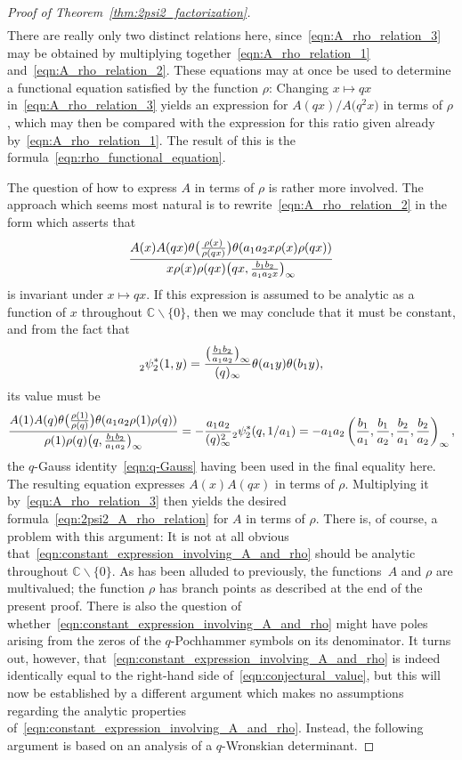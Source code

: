 \documentclass[10pt,a4paper]{amsart}
\numberwithin{equation}{section}
\newcommand{\C}{\mathbb{C}}
\begin{document}
\begin{proof}[Proof of Theorem~\ref{thm:2psi2_factorization}]
\begin{gather}
\end{gather}
There are really only two distinct relations here, since~\eqref{eqn:A_rho_relation_3} may be obtained by multiplying together~\eqref{eqn:A_rho_relation_1} and~\eqref{eqn:A_rho_relation_2}. These equations may at once be used to determine a functional equation satisfied by the function $\rho$: Changing $x \mapsto qx$ in~\eqref{eqn:A_rho_relation_3} yields an expression for $A(qx)/A\bigl(q^2x\bigr)$ in terms of $\rho$, which may then be compared with the expression for this ratio given already by~\eqref{eqn:A_rho_relation_1}. The result of this is the formula~\eqref{eqn:rho_functional_equation}.

The question of how to express $A$ in terms of $\rho$ is rather more involved. The approach which seems most natural is to rewrite~\eqref{eqn:A_rho_relation_2} in the form which asserts that
\begin{equation} \label{eqn:constant_expression_involving_A_and_rho}
{A(x) A(qx) \theta\bigl({\rho(x) \over \rho(qx)}\bigr) \theta (a_1a_2x\rho(x)\rho(qx) ) \over x\rho(x)\rho(qx) \bigl(qx,{b_1b_2 \over a_1a_2x}\bigr)_\infty}
\end{equation}
is invariant under $x \mapsto qx$. If this expression is assumed to be analytic as a function of $x$ throughout $\C \backslash \{0\}$, then we may conclude that it must be constant, and from the fact that
\[ {}_2^{}\psi_2^\ast(1,y) = {\bigl({b_1b_2 \over a_1a_2}\bigr)_\infty \over (q)_\infty} \theta(a_1y)\theta(b_1y), \]
its value must be
\begin{equation} \label{eqn:conjectural_value}
{A(1) A(q) \theta\bigl({\rho(1) \over \rho(q)}\bigr) \theta(a_1a_2\rho(1)\rho(q)) \over \rho(1)\rho(q) \bigl(q,{b_1b_2 \over a_1a_2}\bigr)_\infty} = -{a_1a_2 \over (q)_\infty^2} {}_2^{}\psi_2^\ast(q,1/a_1) = -a_1a_2\left({b_1 \over a_1},{b_1 \over a_2},{b_2 \over a_1},{b_2 \over a_2}\right)_{ \infty},
\end{equation}
the $q$-Gauss identity~\eqref{eqn:q-Gauss} having been used in the final equality here. The resulting equation expresses $A(x)A(qx)$ in terms of $\rho$. Multiplying it by~\eqref{eqn:A_rho_relation_3} then yields the desired formula~\eqref{eqn:2psi2_A_rho_relation} for $A$ in terms of $\rho$. There is, of course, a problem with this argument: It is not at all obvious that~\eqref{eqn:constant_expression_involving_A_and_rho} should be analytic throughout $\C \backslash \{0\}$. As has been alluded to previously, the functions~$A$ and $\rho$ are multivalued; the function $\rho$ has branch points as described at the end of the present proof. There is also the question of whether~\eqref{eqn:constant_expression_involving_A_and_rho} might have poles arising from the zeros of the $q$-Pochhammer symbols on its denominator. It turns out, however, that~\eqref{eqn:constant_expression_involving_A_and_rho} is indeed identically equal to the right-hand side of~\eqref{eqn:conjectural_value}, but this will now be established by a different argument which makes no assumptions regarding the analytic properties of~\eqref{eqn:constant_expression_involving_A_and_rho}. Instead, the following argument is based on an analysis of a $q$-Wronskian determinant.


\end{proof}
\end{document}
